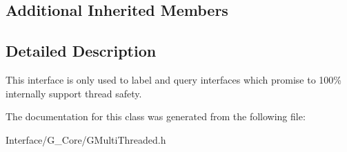 \subsection*{Additional Inherited Members}


\subsection{Detailed Description}
This interface is only used to label and query interfaces which promise to 100\% internally support thread safety. 

The documentation for this class was generated from the following file\+:\begin{DoxyCompactItemize}
\item 
Interface/\+G\+\_\+\+Core/G\+Multi\+Threaded.\+h\end{DoxyCompactItemize}
